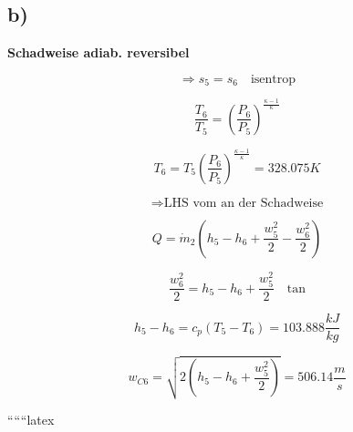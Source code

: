 

\subsection*{b)}

\textbf{Schadweise adiab. reversibel}

\[
\Rightarrow s_5 = s_6 \quad \text{isentrop}
\]

\[
\frac{T_6}{T_5} = \left( \frac{P_6}{P_5} \right)^{\frac{\kappa - 1}{\kappa}}
\]

\[
T_6 = T_5 \left( \frac{P_6}{P_5} \right)^{\frac{\kappa - 1}{\kappa}} = 328.075 K
\]

\[
\Rightarrow \text{LHS vom an der Schadweise}
\]

\[
Q = \dot{m}_2 \left( h_5 - h_6 + \frac{w_5^2}{2} - \frac{w_6^2}{2} \right)
\]

\[
\frac{w_6^2}{2} = h_5 - h_6 + \frac{w_5^2}{2} \quad \text{tan}
\]

\[
h_5 - h_6 = c_p \left( T_5 - T_6 \right) = 103.888 \frac{kJ}{kg}
\]

\[
w_{C6} = \sqrt{2 \left( h_5 - h_6 + \frac{w_5^2}{2} \right)} = 506.14 \frac{m}{s}
\]

``````latex